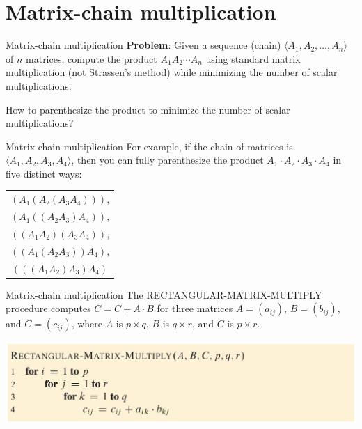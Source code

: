 \documentclass[aspectratio=169]{beamer}
\begin{document}

\section{Matrix-chain multiplication}

\begin{frame}{Matrix-chain multiplication}
    \textbf{Problem}: Given a sequence (chain) $\langle A_1, A_2, \ldots, A_n\rangle$ of $n$ matrices, compute the product $A_1 A_2 \cdots A_n$ using standard matrix multiplication (not Strassen's method) while minimizing the number of scalar multiplications.

    \begin{alertblock}{}
        How to parenthesize the product to minimize the number of scalar multiplications?
    \end{alertblock}
\end{frame}

\begin{frame}{Matrix-chain multiplication}
    For example, if the chain of matrices is $\langle A_1 , A_2 , A_3 , A_4 \rangle$, then you can fully parenthesize the product $A_1 \cdot A_2 \cdot A_3 \cdot A_4$ in five distinct ways:
    \vspace{5mm}

    \centering
    \begin{tabular}{c}
        $(A_1 (A_2 (A_3 A_4)))$, \\
        $(A_1 ((A_2 A_3) A_4))$, \\
        $((A_1 A_2) (A_3 A_4))$, \\
        $((A_1 (A_2 A_3)) A_4)$, \\
        $(((A_1 A_2) A_3) A_4)$ \\
    \end{tabular}
\end{frame}

\begin{frame}{Matrix-chain multiplication}
    The RECTANGULAR-MATRIX-MULTIPLY procedure computes $C = C + A \cdot B$ for three matrices $A = (a_{ij})$, $B = (b_{ij})$, and $C = (c_{ij})$, where $A$ is $p \times q$, $B$ is $q \times r$, and $C$ is $p \times r$.

    \centering
    \includegraphics[width=\textwidth]{figures/rmp}
\end{frame}
\end{document}
